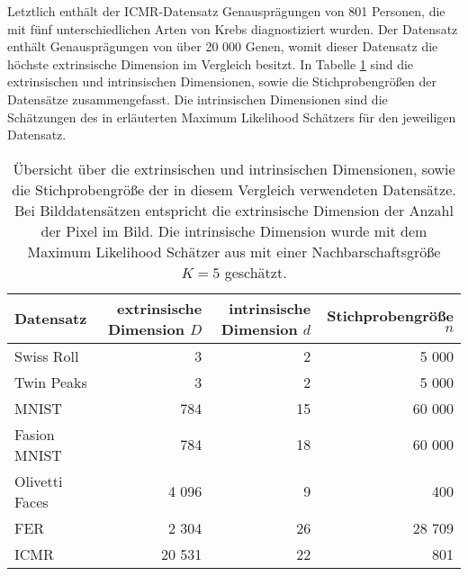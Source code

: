 
Letztlich enthält der ICMR-Datensatz Genausprägungen von 801 Personen, die mit fünf
unterschiedlichen Arten von Krebs diagnostiziert wurden. Der Datensatz enthält Genausprägungen von
über 20 000 Genen, womit dieser Datensatz die höchste extrinsische Dimension im Vergleich besitzt.
In Tabelle \ref{tab:uebersicht-datensaetze} sind die extrinsischen und intrinsischen Dimensionen,
sowie die Stichprobengrößen der Datensätze zusammengefasst. Die intrinsischen Dimensionen sind die
Schätzungen des in 
erläuterten Maximum Likelihood Schätzers für den jeweiligen Datensatz.

\begin{table}[]
	\centering
	\begin{tabular}{@{}lrrr@{}}
		\toprule
		Datensatz      & extrinsische Dimension $D$ & intrinsische Dimension $d$ & Stichprobengröße $n$ \\ \midrule
		Swiss Roll     & 3                          & 2                          & 5 000                \\
		Twin Peaks     & 3                          & 2                          & 5 000                \\
		MNIST          & 784                        & 15                         & 60 000               \\
		Fasion MNIST   & 784                        & 18                         & 60 000               \\
		Olivetti Faces & 4 096                      & 9                          & 400                  \\
		FER            & 2 304                      & 26                         & 28 709               \\
		ICMR           & 20 531                     & 22                         & 801                  \\
		\bottomrule
	\end{tabular}
	\caption[Übersicht über die extrinsischen und intrinsischen Dimensionen, sowie die Stichprobengröße der in diesem Vergleich verwendeten Datensätze]{Übersicht über die extrinsischen und intrinsischen Dimensionen, sowie die Stichprobengröße der in diesem Vergleich verwendeten Datensätze. Bei Bilddatensätzen entspricht die extrinsische Dimension der Anzahl der Pixel im Bild. Die intrinsische Dimension wurde mit dem Maximum Likelihood Schätzer aus  mit einer Nachbarschaftsgröße $K=5$ geschätzt.}
	\label{tab:uebersicht-datensaetze}
\end{table}


